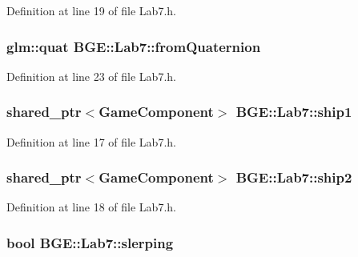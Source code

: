 Definition at line 19 of file Lab7.\-h.

\hypertarget{class_b_g_e_1_1_lab7_a7c21f4e4b7742387e8e226774a06459c}{
\subsubsection[{from\-Quaternion}]{\setlength{\rightskip}{0pt plus 5cm}glm\-::quat B\-G\-E\-::\-Lab7\-::from\-Quaternion}}\label{class_b_g_e_1_1_lab7_a7c21f4e4b7742387e8e226774a06459c}


Definition at line 23 of file Lab7.\-h.

\hypertarget{class_b_g_e_1_1_lab7_ad6f5c61ac49db32554e321834c1e1309}{
\subsubsection[{ship1}]{\setlength{\rightskip}{0pt plus 5cm}shared\-\_\-ptr$<${\bf Game\-Component}$>$ B\-G\-E\-::\-Lab7\-::ship1}}\label{class_b_g_e_1_1_lab7_ad6f5c61ac49db32554e321834c1e1309}


Definition at line 17 of file Lab7.\-h.

\hypertarget{class_b_g_e_1_1_lab7_a6d78f63d3afda6ddd660d008e1175ff6}{
\subsubsection[{ship2}]{\setlength{\rightskip}{0pt plus 5cm}shared\-\_\-ptr$<${\bf Game\-Component}$>$ B\-G\-E\-::\-Lab7\-::ship2}}\label{class_b_g_e_1_1_lab7_a6d78f63d3afda6ddd660d008e1175ff6}


Definition at line 18 of file Lab7.\-h.

\hypertarget{class_b_g_e_1_1_lab7_a8cd5f0601c936db337a92f26288c7a1a}{
\subsubsection[{slerping}]{\setlength{\rightskip}{0pt plus 5cm}bool B\-G\-E\-::\-Lab7\-::slerping}}\label{class_b_g_e_1_1_lab7_a8cd5f0601c936db337a92f26288c7a1a}


